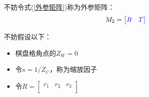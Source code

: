 \documentclass{article}
\begin{document}
不妨令式(\ref{外参矩阵})称为外参矩阵：
	\begin{gather}
	M_2={\color{blue} \left[ \begin{matrix}
			R&		T\\
		\end{matrix} \right] } \label{外参矩阵}
\end{gather}

不妨假设以下：
\begin{itemize}
		\item 棋盘格角点的$Z_W=0$
		\item 令$s ={{1}\big/{Z_C}}$，称为缩放因子
		\item 令$R=\left[ \begin{matrix}
	r_1&		r_2&		r_3\\
\end{matrix} \right] $
\end{itemize}
\end{document}
